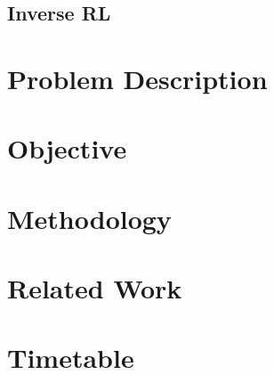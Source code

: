         \subsection{Inverse RL}
        
\section{Problem Description}\label{sec:problem}

\section{Objective}

\section{Methodology}

\section{Related Work}

\newpage
\section{Timetable}
